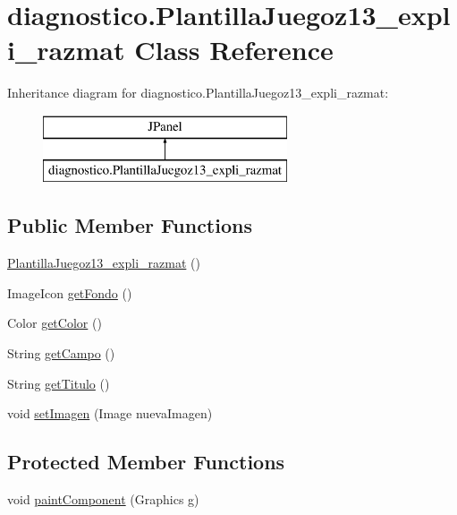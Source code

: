 \hypertarget{classdiagnostico_1_1_plantilla_juegoz13__expli__razmat}{}\section{diagnostico.\+Plantilla\+Juegoz13\+\_\+expli\+\_\+razmat Class Reference}
\label{classdiagnostico_1_1_plantilla_juegoz13__expli__razmat}
Inheritance diagram for diagnostico.\+Plantilla\+Juegoz13\+\_\+expli\+\_\+razmat\+:\begin{figure}[H]
\begin{center}
\leavevmode
\includegraphics[height=2.000000cm]{classdiagnostico_1_1_plantilla_juegoz13__expli__razmat}
\end{center}
\end{figure}
\subsection*{Public Member Functions}
\begin{DoxyCompactItemize}
\item 
\mbox{\hyperlink{classdiagnostico_1_1_plantilla_juegoz13__expli__razmat_a92e27ffadb29f2f499f8e9256a556b66}{Plantilla\+Juegoz13\+\_\+expli\+\_\+razmat}} ()
\item 
Image\+Icon \mbox{\hyperlink{classdiagnostico_1_1_plantilla_juegoz13__expli__razmat_ac8a78b8f02a074270d9b3a08fb04c956}{get\+Fondo}} ()
\item 
Color \mbox{\hyperlink{classdiagnostico_1_1_plantilla_juegoz13__expli__razmat_a69b2ef0156b879ab334fc49e2103f804}{get\+Color}} ()
\item 
String \mbox{\hyperlink{classdiagnostico_1_1_plantilla_juegoz13__expli__razmat_a60ee71aec5d74033efa489ec7d3dedf6}{get\+Campo}} ()
\item 
String \mbox{\hyperlink{classdiagnostico_1_1_plantilla_juegoz13__expli__razmat_a0d8d3e99c2c07486c016770fc4581f3e}{get\+Titulo}} ()
\item 
void \mbox{\hyperlink{classdiagnostico_1_1_plantilla_juegoz13__expli__razmat_adc01814749d1fc36f23ce03f1d85909e}{set\+Imagen}} (Image nueva\+Imagen)
\end{DoxyCompactItemize}
\subsection*{Protected Member Functions}
\begin{DoxyCompactItemize}
\item 
void \mbox{\hyperlink{classdiagnostico_1_1_plantilla_juegoz13__expli__razmat_a863ea5b0a72341ec5548c245bec0b155}{paint\+Component}} (Graphics g)
\end{DoxyCompactItemize}


